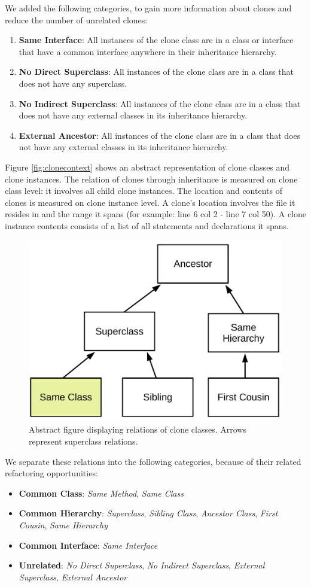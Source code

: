We added the following categories, to gain more information about clones and reduce the number of unrelated clones:

\begin{enumerate}
\item \textbf{Same Interface}: All instances of the clone class are in a class or interface that have a common interface anywhere in their inheritance hierarchy.
\item \textbf{No Direct Superclass}: All instances of the clone class are in a class that does not have any superclass.
\item \textbf{No Indirect Superclass}: All instances of the clone class are in a class that does not have any external classes in its inheritance hierarchy.
\item \textbf{External Ancestor}: All instances of the clone class are in a class that does not have any external classes in its inheritance hierarchy.
\end{enumerate}

Figure \ref{fig:clonecontext} shows an abstract representation of clone classes and clone instances. The relation of clones through inheritance is measured on clone class level: it involves all child clone instances. The location and contents of clones is measured on clone instance level. A clone's location involves the file it resides in and the range it spans (for example: line 6 col 2 - line 7 col 50). A clone instance contents consists of a list of all statements and declarations it spans.

\begin{figure}[H]
  \centering
    \includegraphics[width=0.6\columnwidth]{img/Relation}
      \caption{Abstract figure displaying relations of clone classes. Arrows represent superclass relations.}
  \label{fig:clonerelation}
\end{figure}

We separate these relations into the following categories, because of their related refactoring opportunities:
\begin{itemize}
  \item \textbf{Common Class}: \textit{Same Method}, \textit{Same Class}
  \item \textbf{Common Hierarchy}: \textit{Superclass}, \textit{Sibling Class}, \textit{Ancestor Class}, \textit{First Cousin}, \textit{Same Hierarchy}
  \item \textbf{Common Interface}: \textit{Same Interface}
  \item \textbf{Unrelated}: \textit{No Direct Superclass}, \textit{No Indirect Superclass}, \textit{External Superclass}, \textit{External Ancestor}
\end{itemize}

